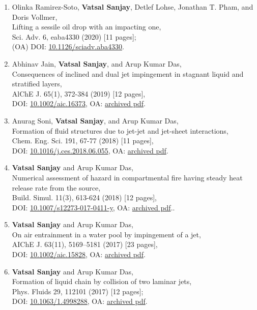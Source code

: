 \documentclass[11pt,a4paper,roman,english,colorlinks,linkcolor={red!50!black}]{moderncv}
\begin{document}
\begin{enumerate}[leftmargin=0.75cm]
	\item Olinka Ramirez-Soto, \textbf{Vatsal Sanjay},  Detlef Lohse,  Jonathan T. Pham, and Doris Vollmer,\\
	Lifting a sessile oil drop with an impacting one,\\
	Sci. Adv. 6, eaba4330  (2020) [11 pages];\\
	(OA) DOI: \href{https://doi.org/10.1126/sciadv.aba4330}{10.1126/sciadv.aba4330}.

	\item Abhinav Jain, \textbf{Vatsal Sanjay}, and Arup Kumar Das,\\
	Consequences of inclined and dual jet impingement in stagnant liquid and stratified layers,\\
	AlChE J. 65(1), 372-384  (2019) [12 pages],\\
	DOI: \href{https://doi.org/10.1002/aic.16373}{10.1002/aic.16373}, OA: \href{https://tinyurl.com/24p5dy8s}{archived pdf}.

	\item Anurag Soni, \textbf{Vatsal Sanjay}, and Arup Kumar Das,\\
	Formation of fluid structures due to jet-jet and jet-sheet interactions,\\
	Chem. Eng. Sci. 191, 67-77  (2018) [11 pages],\\
	DOI: \href{https://doi.org/10.1016/j.ces.2018.06.055}{10.1016/j.ces.2018.06.055}, OA: \href{https://tinyurl.com/2bv5fznd}{archived pdf}.

	\item \textbf{Vatsal Sanjay} and Arup Kumar Das,\\
	Numerical assessment of hazard in compartmental fire having steady heat release rate from the source,\\
	Build. Simul. 11(3), 613-624  (2018) [12 pages],\\
	DOI: \href{https://doi.org/10.1007/s12273-017-0411-y}{10.1007/s12273-017-0411-y}, OA: \href{https://tinyurl.com/2bwhzlzv}{archived pdf}..

	\item \textbf{Vatsal Sanjay} and Arup Kumar Das,\\
	On air entrainment in a water pool by impingement of a jet,\\
	AIChE J. 63(11), 5169--5181  (2017) [23 pages],\\
	DOI: \href{https://doi.org/10.1002/aic.15828}{10.1002/aic.15828}, OA: \href{https://tinyurl.com/24ne4oql}{archived pdf}.

	\item \textbf{Vatsal Sanjay} and Arup Kumar Das,\\
	Formation of liquid chain by collision of two laminar jets,\\
	Phys. Fluids 29, 112101  (2017) [12 pages];\\
	DOI: \href{https://doi.org/10.1063/1.4998288}{10.1063/1.4998288}, OA: \href{https://tinyurl.com/27sd7lgo}{archived pdf}.

\end{enumerate}
\end{document}
